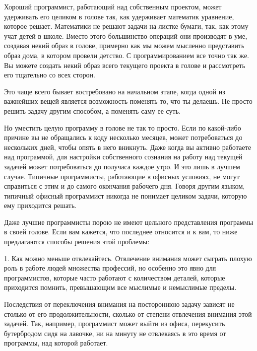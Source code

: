\documentclass[ebook,12pt,oneside,openany]{memoir}
\date{}
\begin{document}
\maketitle

Хороший программист, работающий над собственным проектом, может
удерживать его целиком в голове так, как удерживает математик
уравнение, которое решает. Математики не решают задачи на листке
бумаги, так, как этому учат детей в школе. Вместо этого большинство
операций они производят в уме, создавая некий образ в голове, примерно
как мы можем мысленно представить образ дома, в котором провели
детство. С программированием все точно так же. Вы можете создать некий
образ всего текущего проекта в голове и рассмотреть его тщательно со
всех сторон.

Это чаще всего бывает востребовано на начальном этапе, когда одной из
важнейших вещей является возможность поменять то, что ты делаешь. Не
просто решить задачу другим способом, а поменять саму ее суть.

Но уместить целую программу в голове не так то просто. Если по
какой-либо причине вы не обращались к коду несколько месяцев, может
потребоваться до нескольких дней, чтобы опять в него вникнуть. Даже
когда вы активно работаете над программой, для настройки собственного
сознания на работу над текущей задачей может потребоваться до получаса
каждое утро. И это лишь в лучшем случае. Типичные программисты,
работающие в офисных условиях, не могут справиться с этим и до самого
окончания рабочего дня. Говоря другим языком, типичный офисный
программист никогда не понимает целиком задачи, которую ему приходится
решать.

Даже лучшие программисты порою не имеют цельного представления
программы в своей голове. Если вам кажется, что последнее относится и
к вам, то ниже предлагаются способы решения этой проблемы:

1. Как можно меньше отвлекайтесь. Отвлечение внимания может сыграть
плохую роль в работе людей множества профессий, но особенно это явно
для программистов, которые часто работают с количеством деталей,
которые приходится помнить, превышающим все мыслимые и немыслимые
пределы.

Последствия от переключения внимания на постороннюю задачу зависят не
столько от его продолжительности, сколько от степени отвлечения
внимания этой задачей. Так, например, программист может выйти из
офиса, перекусить бутербродом сидя на лавочке, ни на минуту не
отвлекаясь в это время от программы, над которой работает.
\end{document}
